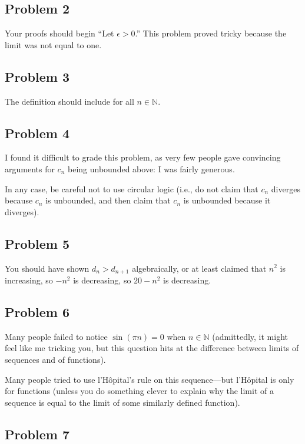\documentclass[12pt]{article}
\newcommand{\N}{\mathbb{N}}
\begin{document}
\subsection*{Problem 2}

Your proofs should begin ``Let $\epsilon > 0$.''  This problem proved tricky because the limit was not equal to one.

\subsection*{Problem 3}

The definition should include for all $n \in \N$.

\subsection*{Problem 4}

I found it difficult to grade this problem, as very few people gave
convincing arguments for $c_n$ being unbounded above: I was fairly
generous.

In any case, be careful not to use circular logic (i.e., do not claim
that $c_n$ diverges because $c_n$ is unbounded, and then claim that
$c_n$ is unbounded because it diverges).

\subsection*{Problem 5}

You should have shown $d_n > d_{n+1}$ algebraically, or at least
claimed that $n^2$ is increasing, so $-n^2$ is decreasing, so $20 -
n^2$ is decreasing.

\subsection*{Problem 6}

Many people failed to notice $\sin(\pi n) = 0$ when $n \in \N$
(admittedly, it might feel like me tricking you, but this question
hits at the difference between limits of sequences and of functions).

Many people tried to use l'H\^opital's rule on this sequence---but
l'H\^opital is only for functions (unless you do something clever to
explain why the limit of a sequence is equal to the limit of some
similarly defined function).

\subsection*{Problem 7}
\end{document}

